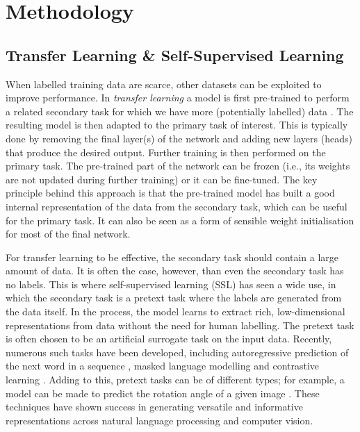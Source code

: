 \documentclass[a4paper,12pt]{article}
\begin{document}
\section{Methodology}
\label{sec:methodology}
\subsection{Transfer Learning \& Self-Supervised Learning}
\label{sec:ssl}
When labelled training data are scarce, other datasets can be exploited to improve performance. In \emph{transfer learning} a model is first pre-trained to perform a related secondary task for which we have more (potentially labelled) data \cite{udl}. The resulting model is then adapted to the primary task of interest. This is typically done by removing the final layer(s) of the network and adding new layers (heads) that produce the desired output. Further training is then performed on the primary task. The pre-trained part of the network can be frozen (i.e., its weights are not updated during further training) or it can be fine-tuned. The key principle behind this approach is that the pre-trained model has built a good internal representation of the data from the secondary task, which can be useful for the primary task. It can also be seen as a form of sensible weight initialisation for most of the final network.

For transfer learning to be effective, the secondary task should contain a large amount of data. It is often the case, however, than even the secondary task has no labels. This is where self-supervised learning (SSL) has seen a wide use, in which the secondary task is a pretext task where the labels are generated from the data itself. In the process, the model learns to extract rich, low-dimensional representations from data without the need for human labelling. The pretext task is often chosen to be an artificial surrogate task on the input data. Recently, numerous such tasks have been developed, including autoregressive prediction of the next word in a sequence \cite{radford2019language}, masked language modelling \cite{devlin2018bert} and contrastive learning \cite{radford2021learning}. Adding to this, pretext tasks can be of different types; for example,  a model can be made to predict the rotation angle of a given image \cite{hintonsimpleframework}. These techniques have shown success in generating versatile and informative representations across natural language processing and computer vision.
\end{document}
